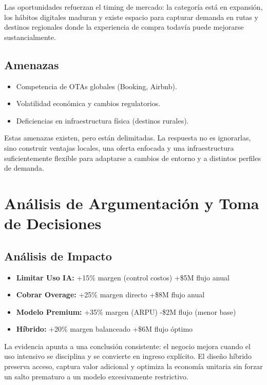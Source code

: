 \documentclass[12pt]{article}
\begin{document}
Las oportunidades refuerzan el timing de mercado: la categoría está en expansión, los hábitos digitales maduran y existe espacio para capturar demanda en rutas y destinos regionales donde la experiencia de compra todavía puede mejorarse sustancialmente.

\subsection{Amenazas}

\begin{itemize}
    \item Competencia de OTAs globales (Booking, Airbnb).
    \item Volatilidad económica y cambios regulatorios.
    \item Deficiencias en infraestructura física (destinos rurales).
\end{itemize}

Estas amenazas existen, pero están delimitadas. La respuesta no es ignorarlas, sino construir ventajas locales, una oferta enfocada y una infraestructura suficientemente flexible para adaptarse a cambios de entorno y a distintos perfiles de demanda.

\section{Análisis de Argumentación y Toma de Decisiones}

\subsection{Análisis de Impacto}

\begin{itemize}
    \item \textbf{Limitar Uso IA:} +15\% margen (control costos) +\$5M flujo anual
    \item \textbf{Cobrar Overage:} +25\% margen directo +\$8M flujo anual
    \item \textbf{Modelo Premium:} +35\% margen (ARPU) -\$2M flujo (menor base)
    \item \textbf{Híbrido:} +20\% margen balanceado +\$6M flujo óptimo
\end{itemize}

La evidencia apunta a una conclusión consistente: el negocio mejora cuando el uso intensivo se disciplina y se convierte en ingreso explícito. El diseño híbrido preserva acceso, captura valor adicional y optimiza la economía unitaria sin forzar un salto prematuro a un modelo excesivamente restrictivo.
\end{document}

